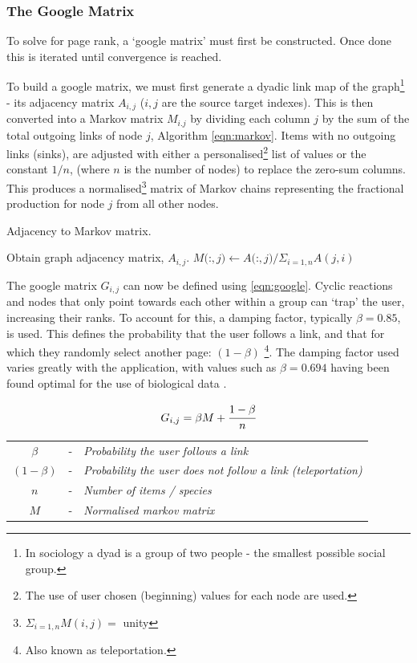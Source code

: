 \subsubsection{The Google Matrix}
To solve for page rank, a `google matrix' must first be constructed. Once done this is iterated until convergence is reached. 

To build a google matrix, we must first generate a dyadic link map of the graph\footnote{In sociology a dyad is a group of two people - the smallest possible social group.} - its adjacency matrix $A_{i,j}$ ($i,j$ are the source target indexes). This is then converted into a Markov matrix $M_{i.j}$ by dividing each column $j$ by the sum of the total outgoing links of node $j$, Algorithm \ref{eqn:markov}.
Items with no outgoing links (sinks), are adjusted with either a personalised\footnote{The use of user chosen (beginning) values for each node are used.} list of values or the constant $1/n$, (where $n$ is the number of nodes) to replace the zero-sum columns. This produces a normalised\footnote{ \: $\Sigma_{i=1,n} M(i,j) = $ unity} matrix of Markov chains representing the fractional production for node $j$ from all other nodes.

\begin{algorithm} \caption{Adjacency to Markov matrix.}
\begin{algorithmic}[1]
\State Obtain graph adjacency matrix, $A_{i,j}$.
\Repeat
{}
\State $M($:$,j) \gets A($:$,j) / \Sigma_{i=1,n} A(j,i)$
\EndFor
{}

\end{algorithmic}\label{eqn:markov}
\end{algorithm}



The google matrix $G_{i,j}$ can now be defined using \autoref{eqn:google}.
 Cyclic reactions and nodes that only point towards each other within a group can `trap' the user, increasing their ranks. 
 To account for this, a damping factor, typically $\beta = 0.85$, is used. This defines the probability that the user follows a link, and that for which they randomly select another page: $(1-\beta)$ \footnote{Also known as teleportation.}. The damping factor used varies greatly with the application, with values such as $\beta = 0.694$ having been found optimal for the use of biological data \citep{biopr}.


\begin{center}
\begin{equation}
     G_{i,j} = \beta M + \cfrac{1 - \beta}{n}
 \label{eqn:google}
\end{equation}
\begin{tabular}{ccl}
$\beta$&-&\textit{Probability the user follows a link} \\
 $(1 - \beta)$&-&\textit{Probability the user does not follow a link (teleportation)} \\
$n$&-&\textit{Number of items / species}\\
$M$&-&\textit{Normalised markov matrix}
\end{tabular}
\end{center}


